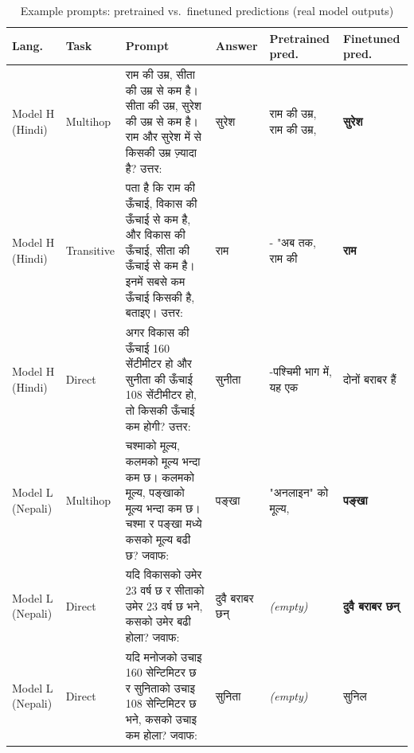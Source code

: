 \begin{table}[H]\centering
\caption{Example prompts: pretrained vs.\ finetuned predictions (real model outputs)}
\small
\begin{tabular}{p{1.3cm}p{1cm}p{5.2cm}p{1.6cm}p{2.6cm}p{1.6cm}}\toprule
Lang.\ & Task & Prompt & Answer & Pretrained pred. & Finetuned pred.\\\midrule
Model H (Hindi) & Multihop & राम की उम्र, सीता की उम्र से कम है। सीता की उम्र, सुरेश की उम्र से कम है। राम और सुरेश में से किसकी उम्र ज़्यादा है? उत्तर: & सुरेश & राम की उम्र, राम की उम्र, & \textbf{सुरेश}\\
Model H (Hindi) & Transitive & पता है कि राम की ऊँचाई, विकास की ऊँचाई से कम है, और विकास की ऊँचाई, सीता की ऊँचाई से कम है। इनमें सबसे कम ऊँचाई किसकी है, बताइए। उत्तर: & राम & - "अब तक, राम की & \textbf{राम}\\
Model H (Hindi) & Direct & अगर विकास की ऊँचाई 160 सेंटीमीटर हो और सुनीता की ऊँचाई 108 सेंटीमीटर हो, तो किसकी ऊँचाई कम होगी? उत्तर: & सुनीता & -पश्चिमी भाग में, यह एक & दोनों बराबर हैं\\
Model L (Nepali) & Multihop & चश्माको मूल्य, कलमको मूल्य भन्दा कम छ। कलमको मूल्य, पङ्खाको मूल्य भन्दा कम छ। चश्मा र पङ्खा मध्ये कसको मूल्य बढी छ? जवाफ: & पङ्खा & "अनलाइन" को मूल्य, & \textbf{पङ्खा}\\
Model L (Nepali) & Direct & यदि विकासको उमेर 23 वर्ष छ र सीताको उमेर 23 वर्ष छ भने, कसको उमेर बढी होला? जवाफ: & दुवै बराबर छन् & \textit{(empty)} & \textbf{दुवै बराबर छन्}\\
Model L (Nepali) & Direct & यदि मनोजको उचाइ 160 सेन्टिमिटर छ र सुनिताको उचाइ 108 सेन्टिमिटर छ भने, कसको उचाइ कम होला? जवाफ: & सुनिता & \textit{(empty)} & सुनिल\\
\bottomrule\end{tabular}
\end{table}